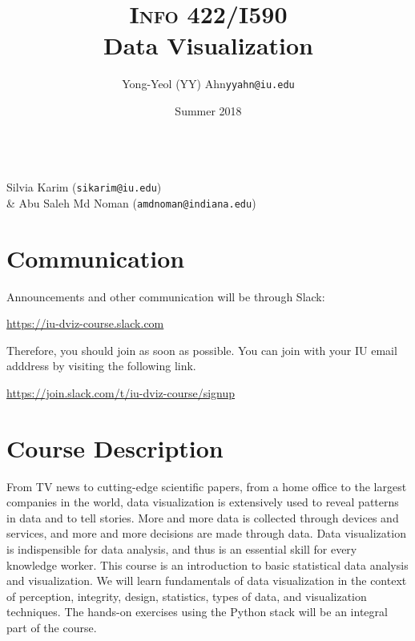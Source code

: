\documentclass[11pt,article,oneside]{memoir} %
\makeatletter
\def\myauthor{Author}
\def\mytitle{Title}
\def\myemail{yyahn@iu.edu}
\def\myauthor{Yong-Yeol (YY) Ahn}
\def\mytitle{{\normalsize \textsc{Info} 422/I590} \\ \HUGE Data Visualization}
\makeatother
\begin{document}

\title{\LARGE \mytitle} %
\author{\Large\myauthor \newline \footnotesize\texttt{\noindent\myemail}}
\date{Summer 2018} %

\maketitle 

\vspace{-20pt}{\bfseries Assistant Instructors} \\ Silvia Karim (\texttt{sikarim@iu.edu})  \\ \&
Abu Saleh Md Noman (\texttt{amdnoman@indiana.edu}) 
\section{Communication} %

Announcements and other communication will be through Slack: 

\url{https://iu-dviz-course.slack.com}

Therefore, you should join as soon as possible. You can join with your IU email adddress by visiting the following link. 

\url{https://join.slack.com/t/iu-dviz-course/signup}

\section{Course Description}%

From TV news to cutting-edge scientific papers, from a home office to the
largest companies in the world, data visualization is extensively used to
reveal patterns in data and to tell stories. More and more data is collected
through devices and services, and more and more decisions are made through
data. Data visualization is indispensible for data analysis, and thus is an
essential skill for every knowledge worker.  This course is an introduction to
basic statistical data analysis and visualization.  We will learn fundamentals
of data visualization in the context of perception, integrity, design,
statistics, types of data, and visualization techniques.  The hands-on
exercises using the Python stack will be an integral part of the course. 
\end{document}
